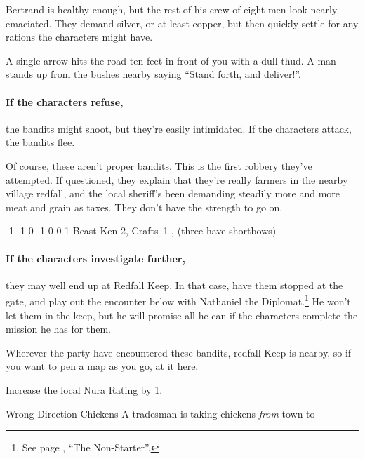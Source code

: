 \begin{multicols}{2}
Bertrand is healthy enough, but the rest of his crew of eight men look nearly emaciated.
They demand silver, or at least copper, but then quickly settle for any rations the characters might have.

\begin{boxtext}

	A single arrow hits the road ten feet in front of you with a dull thud.
	A man stands up from the bushes nearby saying ``Stand forth, and deliver!''.

\end{boxtext}

\paragraph{If the characters refuse,}
the bandits might shoot, but they're easily intimidated.  If the characters attack, the bandits flee.

Of course, these aren't proper bandits.
This is the first robbery they've attempted.
If questioned, they explain that they're really farmers in the nearby village \gls{redfall}, and the local sheriff's been demanding steadily more and more meat and grain as taxes.
They don't have the strength to go on.


	{-1}%
	{-1}%
	{{0}%
	{-1}%
	{0}}%
	{0}%
	{1}%
	{Beast Ken 2, Crafts~1}%
	{\Dagger, (three have shortbows)}%
	{}

\paragraph{If the characters investigate further,}
they may well end up at Redfall Keep.
In that case, have them stopped at the gate, and play out the encounter below with Nathaniel the Diplomat.\footnote{See page \pageref{nonstarter}, ``The Non-Starter''.}
He won't let them in the keep, but he will promise all he can if the characters complete the mission he has for them.

Wherever the party have encountered these bandits, \gls{redfall} Keep is nearby, so if you want to pen a map as you go, at it here.

Increase the local Nura Rating by 1.

{\N Wrong Direction Chickens}%
{A tradesman is taking chickens \emph{from} town to }%


\end{multicols}
